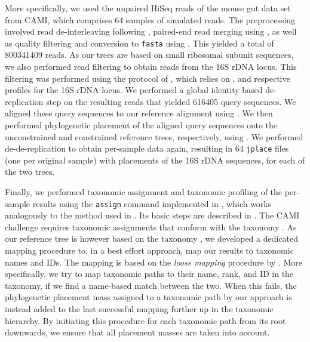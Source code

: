 More specifically, we used the unpaired HiSeq reads of the mouse gut data set from CAMI,
which comprises \num{64} samples of simulated reads.
The preprocessing involved read de-interleaving following \cite{DeinterleaveFastq},
paired-end read merging using  \citep{Zhang2014},
as well as quality filtering and conversion to \texttt{fasta} using  \citep{Rognes2016}.
This yielded a total of \num{800 341 409} reads.
As our trees are based on small ribosomal subunit sequences,
we also performed read filtering to obtain reads from the 16S rDNA locus.
This filtering was performed using the protocol of \cite{Logares2014},
which relies on  \citep{Eddy1998,Eddy2009}, and respective profiles for the 16S rDNA locus.
We performed a global identity based de-replication step on the resulting reads that yielded \num{616 405} query sequences.
We aligned these query sequences to our  reference alignment
using  \citep{Berger2011a,Berger2012}.
We then performed phylogenetic placement of the aligned query sequences onto the unconstrained and constrained reference trees,
respectively, using  \citep{Barbera2018}.
We performed de-de-replication to obtain per-sample data again, %
resulting in \num{64} \texttt{jplace} files (one per original sample) with placements of the 16S rDNA sequences,
for each of the two trees.

Finally, we performed taxonomic assignment and taxonomic profiling of the per-sample results
using the \texttt{assign} command implemented in ,
which works analogously to the method used in  \citep{Kozlov2016}.
Its basic steps are described in .
The CAMI challenge requires taxonomic assignments
that conform with the  taxonomy \citep{Sayers2009,Benson2009}.
As our reference tree is however based on the  taxonomy \citep{Yilmaz2014},
we developed a dedicated mapping procedure to, in a best effort approach,
map our results to  taxonomic names and IDs.
The mapping is based on the \textit{loose mapping} procedure by \cite{Balvociute2017}.
More specifically, we try to map taxonomic paths to their name, rank, and ID in the  taxonomy,
if we find a name-based match between the two.
When this fails, the phylogenetic placement mass assigned to a taxonomic path by our approach
is instead added to the last successful mapping further up in the taxonomic hierarchy.
By initiating this procedure for each taxonomic path from its root downwards,
we ensure that all placement masses are taken into account.


